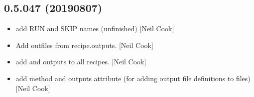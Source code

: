 \documentclass[a4paper,10pt,english]{report}
\begin{document}
\subsection{0.5.047 (2019\sphinxhyphen{}08\sphinxhyphen{}07)}
\label{\detokenize{misc/changelog:id115}}\begin{itemize}
\item {} 
 \sphinxhyphen{} add RUN and SKIP names (unfinished) {[}Neil Cook{]}

\item {} 
Add outfiles from recipe.outputs. {[}Neil Cook{]}

\item {} 
 \sphinxhyphen{} add  and outputs to all recipes.
{[}Neil Cook{]}

\item {} 
 \sphinxhyphen{} add  method and outputs attribute (for
adding output file definitions to files) {[}Neil Cook{]}

\end{itemize}
\end{document}
